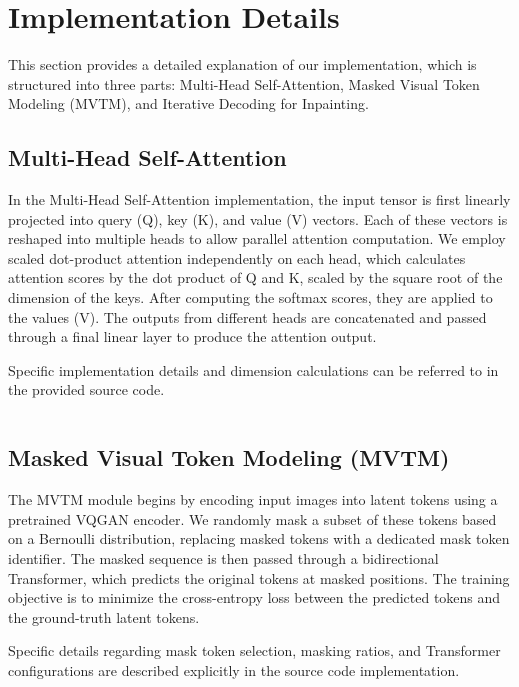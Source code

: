 \section{Implementation Details}
\label{sec:implementation}

This section provides a detailed explanation of our implementation, which is structured into three parts: Multi-Head Self-Attention, Masked Visual Token Modeling (MVTM), and Iterative Decoding for Inpainting.

\subsection{Multi-Head Self-Attention}
In the Multi-Head Self-Attention implementation, the input tensor is first linearly projected into query (Q), key (K), and value (V) vectors.
Each of these vectors is reshaped into multiple heads to allow parallel attention computation.
We employ scaled dot-product attention independently on each head, which calculates attention scores by the dot product of Q and K, scaled by the square root of the dimension of the keys.
After computing the softmax scores, they are applied to the values (V).
The outputs from different heads are concatenated and passed through a final linear layer to produce the attention output.

Specific implementation details and dimension calculations can be referred to in the provided source code.

\inputminted[firstline=4, lastline=35]{python}{../models/Transformer/modules/layers.py}

\subsection{Masked Visual Token Modeling (MVTM)}
The MVTM module begins by encoding input images into latent tokens using a pretrained VQGAN encoder.
We randomly mask a subset of these tokens based on a Bernoulli distribution, replacing masked tokens with a dedicated mask token identifier.
The masked sequence is then passed through a bidirectional Transformer, which predicts the original tokens at masked positions.
The training objective is to minimize the cross-entropy loss between the predicted tokens and the ground-truth latent tokens.

Specific details regarding mask token selection, masking ratios, and Transformer configurations are described explicitly in the source code implementation.
\inputminted[firstline=33, lastline=35]{python}{../models/VQGAN_Transformer.py}
\inputminted[firstline=58, lastline=69]{python}{../models/VQGAN_Transformer.py}

